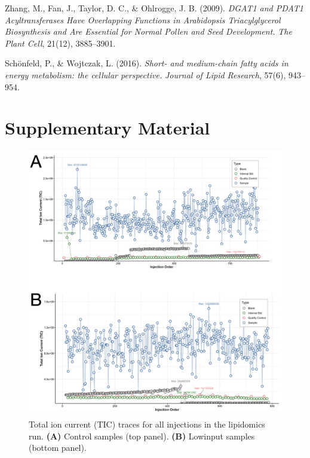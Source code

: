 \documentclass[10pt,letterpaper]{article}
\newcommand{\beginsupplement}{%
  \setcounter{table}{0}%
  \renewcommand{\thetable}{S\arabic{table}}%
  \setcounter{figure}{0}%
  \renewcommand{\thefigure}{S\arabic{figure}}}
\begin{document}
\begin{itemize}
\begin{thebibliography}{10}
Zhang, M., Fan, J., Taylor, D. C., \& Ohlrogge, J. B. (2009).  
\emph{DGAT1 and PDAT1 Acyltransferases Have Overlapping Functions in Arabidopsis Triacylglycerol Biosynthesis and Are Essential for Normal Pollen and Seed Development.}  
\textit{The Plant Cell}, 21(12), 3885–3901.

Schönfeld, P., \& Wojtczak, L. (2016).  
\emph{Short- and medium-chain fatty acids in energy metabolism: the cellular perspective.}  
\textit{Journal of Lipid Research}, 57(6), 943–954.


\end{thebibliography}

\FloatBarrier
\section*{Supplementary Material}
\beginsupplement


\begin{figure}[htp]
  \centering
  \includegraphics[width=\textwidth]{fig/supp/SuppFig1.png}
  \caption{
    Total ion current (TIC) traces for all injections in the lipidomics run. 
    {\bf(A)} Control samples (top panel). 
    {\bf(B)} Lowinput samples (bottom panel).
  }
  \label{fig:S1}
\end{figure}




\end{itemize}
\end{document}
